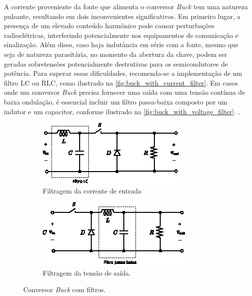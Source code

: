 A corrente proveniente da fonte que alimenta o conversor \textit{Buck} tem uma natureza pulsante, resultando em dois inconvenientes significativos. Em primeiro lugar, a presença de um elevado conteúdo harmônico pode causar perturbações radioelétricas, interferindo potencialmente nos equipamentos de comunicação e sinalização. Além disso, caso haja indutância em série com a fonte, mesmo que seja de natureza parasitária, no momento da abertura da chave, podem ser geradas sobretensões potencialmente destrutivas para os semicondutores de potência. Para superar essas dificuldades, recomenda-se a implementação de um filtro LC ou RLC, como ilustrado na \autoref{fig:buck_with_current_filter}. Em casos onde um conversor \textit{Buck} precisa fornecer uma saída com uma tensão contínua de baixa ondulação, é essencial incluir um filtro passa-baixa composto por um indutor e um capacitor, conforme ilustrado na \autoref{fig:buck_with_voltage_filter}. \citep{martins2008}.

\begin{figure}[H]
  \captionsetup{justification=centering}
  \centering
  \begin{subfigure}[t]{0.45\textwidth}
    \centering
    \includegraphics[width=\textwidth]{figuras/buck_with_current_filter.eps}
    \caption{Filtragem da corrente de entrada}
    \label{fig:buck_with_current_filter}
  \end{subfigure}
  \hfil
  \begin{subfigure}[t]{0.45\textwidth}
    \centering
    \includegraphics[width=\textwidth]{figuras/buck_with_voltage_filter.eps}
    \caption{Filtragem da tensão de saída.}
    \label{fig:buck_with_voltage_filter}
  \end{subfigure}
  \caption{Conversor \textit{Buck} com filtros.}
\end{figure}

